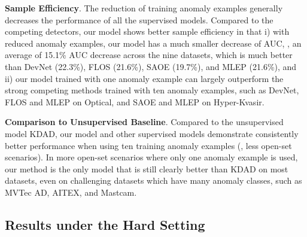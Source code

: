 \documentclass[10pt,twocolumn,letterpaper]{article}
\begin{document}
\textbf{Sample Efficiency}. The reduction of training anomaly examples generally decreases the performance of all the supervised models. Compared to the competing detectors, our model shows better sample efficiency in that i) with reduced anomaly examples, our model has a much smaller decrease of AUC, \ie, an average of 15.1\% AUC decrease across the nine datasets, which is much better than DevNet (22.3\%), FLOS (21.6\%), SAOE (19.7\%), and MLEP (21.6\%), and ii) our model trained with one anomaly example can largely outperform the strong competing methods trained with ten anomaly examples, such as DevNet, FLOS and MLEP on Optical, and SAOE and MLEP on Hyper-Kvasir.


\textbf{Comparison to Unsupervised Baseline}. Compared to the unsupervised model KDAD, our model and other supervised models demonstrate consistently better performance when using ten training anomaly examples (\ie, less open-set scenarios). In more open-set scenarios where only one anomaly example is used, our method is the only model that is still clearly better than KDAD on most datasets, even on challenging datasets which have many anomaly classes, such as MVTec AD, AITEX, and Mastcam. 

\subsection{Results under the Hard Setting}
\end{document}
